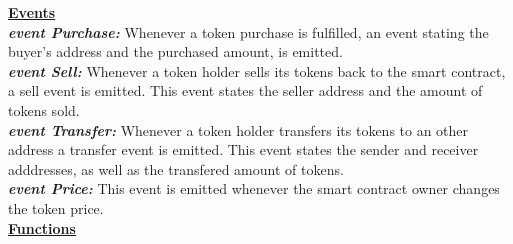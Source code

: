 \documentclass[12pt,a4paper]{article}
\begin{document}
\textbf{\underline{Events}} \\

\textbf{\emph{event Purchase:}} Whenever a token purchase is fulfilled, an event stating
the buyer's address and the purchased amount, is emitted.\\
\textbf{\emph{event Sell:}} Whenever a token holder sells its tokens back to the smart
contract, a sell event is emitted. This event states the seller address and the
amount of tokens sold.\\
\textbf{\emph{event Transfer:}} Whenever a token holder transfers its tokens to an other
address a transfer event is emitted. This event states the sender and receiver
adddresses, as well as the transfered amount of tokens.\\
\textbf{\emph{event Price:}} This event is emitted whenever the smart contract owner
changes the token price.\\

\textbf{\underline{Functions}} \\
\end{document}
